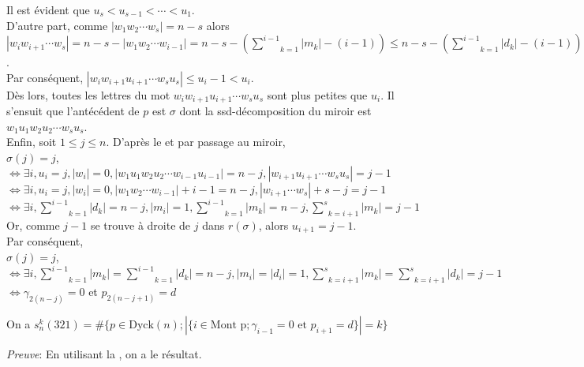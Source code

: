 Il est évident que $u_s < u_{s-1}< \cdots < u_1$.\\
D'autre part, comme $|w_{1}w_{2}\cdots w_{s}| = n-s$ alors $|w_i w_{i+1} \cdots w_{s} | = n-s - |w_{1}w_{2}\cdots w_{i-1}| = n-s - (\underset{k=1}{\overset{i-1}{\sum}} |m_{k}| - (i-1)) \leq n-s - (\underset{k=1}{\overset{i-1}{\sum}} |d_{k}| - (i-1)) =  \underset{k=i}{\overset{s}{\sum}} |d_{k}| - (s-i +1)= u_{i} - (s-i+1)$.\\
Par conséquent, $| w_{i}w_{i+1}u_{i+1}\cdots w_{s}u_{s} |\leq u_{i}-1< u_i$.\\
Dès lors, toutes les lettres du mot $w_{i} w_{i+1} u_{i+1} \cdots w_s u_s$ sont plus petites que $u_i$. Il s'ensuit que l'antécédent de $p$ est $\sigma$ dont la ssd-décomposition du miroir est $w_1 u_1 w_2 u_2 \cdots w_s u_s$.\vspace{10pt}\\
Enfin, soit $1 \leq j \leq n$. D'après le  et par passage au miroir,\\
$\sigma(j) = j$,\\
$\iff \exists i, u_i = j, |w_i | = 0, |w_1 u_1 w_2 u_2 \cdots w_{i-1} u_{i-1} | = n - j, |w_{i+1} u_{i+1} \cdots w_s u_s | = j - 1$\\
$\iff \exists i, u_i = j, |w_i | = 0, |w_1  w_2  \cdots w_{i-1} | + i-1 = n - j, |w_{i+1} \cdots w_s | + s-j = j - 1$\\
$\iff \exists i, \underset{k=1}{\overset{i-1}{\sum}}|d_{k}| = n-j , |m_{i}| = 1, \underset{k=1}{\overset{i-1}{\sum}}|m_{k}| = n-j, \underset{k=i+1}{\overset{s}{\sum}}|m_{k}| = j-1 $\\
Or, comme $j - 1$ se trouve à droite de $j$ dans $r(\sigma)$, alors $u_{i+1} = j - 1$.
\text{}\\
Par conséquent,\\ $\sigma(j)=j$, \\
$\iff \exists i, \underset{k=1}{\overset{i-1}{\sum}}|m_{k}| =\underset{k=1}{\overset{i-1}{\sum}}|d_{k}| =n-j, |m_{i}| = |d_{i}| = 1,  \underset{k=i+1}{\overset{s}{\sum}}|m_{k}| =  \underset{k=i+1}{\overset{s}{\sum}}|d_{k}|=j-1 $\\
$\iff \gamma_{2(n-j)}=0$ et $p_{2(n-j+1)}=d$


\begin{corollaire} \label{dn321ToFn}
	On a $s_{n}^{k}(321) =  \# \{p \in \text{Dyck}(n); |\{i \in \text{Mont p}; \gamma_{i-1}=0 \text{ et } p_{i+1}=d\}|=k\} $
\end{corollaire}
\textit{Preuve}:
En utilisant la , on a le résultat.

